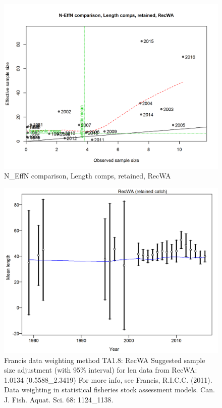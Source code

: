 \documentclass[12pt,]{article}
\begin{document}
\begin{figure}[htbp]
\centering
\includegraphics{./r4ss/plots_mod1/comp_lenfit_sampsize_flt4mkt2.png}
\caption{N\_EffN comparison, Length comps, retained, RecWA
\label{fig:mod1_20_comp_lenfit_sampsize_flt4mkt2}}
\end{figure}

\begin{figure}[htbp]
\centering
\includegraphics{./r4ss/plots_mod1/comp_lenfit_data_weighting_TA1.8_RecWA.png}
\caption{Francis data weighting method TA1.8: RecWA Suggested sample
size adjustment (with 95\% interval) for len data from RecWA: 1.0134
(0.5588\_2.3419) For more info, see Francis, R.I.C.C. (2011). Data
weighting in statistical fisheries stock assessment models. Can. J.
Fish. Aquat. Sci. 68: 1124\_1138.
\label{fig:mod1_21_comp_lenfit_data_weighting_TA1.8_RecWA}}
\end{figure}
\end{document}
